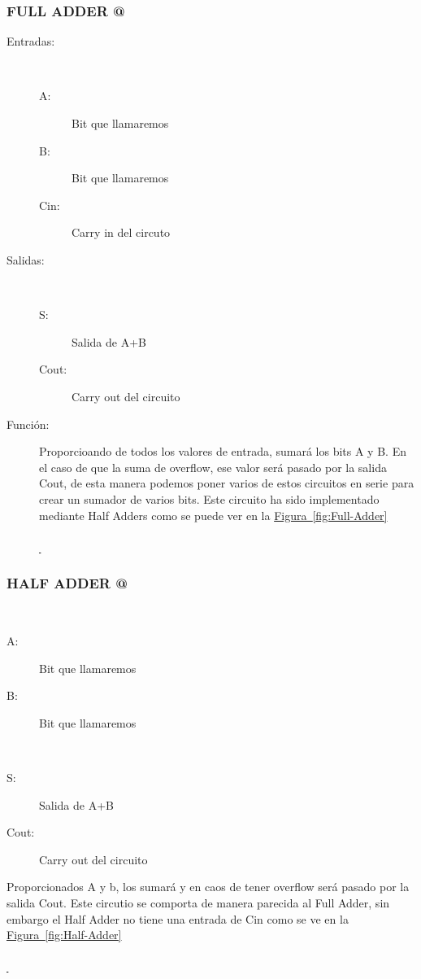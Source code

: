 \documentclass{article}
\newcommand*{\figref}[2][]{
  \hyperref[{fig:#2}]{
    Figura~\ref*{fig:#2}
    \ifx\\#1\\%
    \else
      \,#1
    \fi
  }
}
\begin{document}
\subsubsection{FULL ADDER @}
\label{sec:FULLADDER}
\begin{description}

    \item[Entradas: ] 
    \begin{description}
        \item[A:] Bit que llamaremos 
        \item[B:] Bit que llamaremos 
        \item[Cin:] Carry in del circuto
    \end{description}
    
    \item[Salidas: ] 
    \begin{description}
        \item[S: ] Salida de A+B
        \item[Cout: ] Carry out del circuito
    \end{description}
    
    \item[Función: ]Proporcioando de todos los valores de entrada, sumará los bits A y B. En el caso de que la suma de overflow, ese valor será pasado por la salida Cout, de esta manera podemos poner varios de estos circuitos en serie para crear un sumador de varios bits. Este circuito ha sido implementado mediante Half Adders como se puede ver en la\figref{Full-Adder}
\end{description}


\subsubsection{HALF ADDER @}
\label{sec:HALFADDER}
\begin{description}

    \item[Entradas: ] 
    \begin{description}
        \item[A:] Bit que llamaremos 
        \item[B:] Bit que llamaremos  
    \end{description}
    
    \item[Salidas: ] 
    \begin{description}
        \item[S: ] Salida de A+B
        \item[Cout: ] Carry out del circuito
    \end{description}
    
    \item[Función: ]Proporcionados A y b, los sumará y en caos de tener overflow será pasado por la salida Cout. Este circutio se comporta de manera parecida al Full Adder, sin embargo el Half Adder no tiene una entrada de Cin como se ve en la\figref{Half-Adder}
\end{description}
\end{document}
